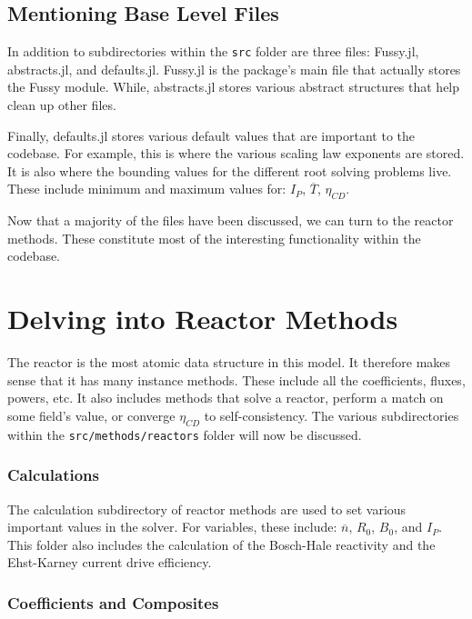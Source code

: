 \subsection{Mentioning Base Level Files}

In addition to subdirectories within the \texttt{src} folder are three files: Fussy.jl, abstracts.jl, and defaults.jl. Fussy.jl is the package's main file that actually stores the Fussy module. While, abstracts.jl stores various abstract structures that help clean up other files.

Finally, defaults.jl stores various default values that are important to the codebase. For example, this is where the various scaling law exponents are stored. It is also where the bounding values for the different root solving problems live. These include minimum and maximum values for: $I_P$, $\overline T$, $\eta_{CD}$.

Now that a majority of the files have been discussed, we can turn to the reactor methods. These constitute most of the interesting functionality within the codebase. 

\section{Delving into Reactor Methods}

The reactor is the most atomic data structure in this model. It therefore makes sense that it has many instance methods. These include all the coefficients, fluxes, powers, etc. It also includes methods that solve a reactor, perform a match on some field's value, or converge $\eta_{CD}$ to self-consistency. The various subdirectories within the \texttt{src/methods/reactors} folder will now be discussed.

\subsubsection{Calculations}

The calculation subdirectory of reactor methods are used to set various important values in the solver. For  variables, these include: $\overline n$, $R_0$, $B_0$, and $I_P$. This folder also includes the calculation of the Bosch-Hale reactivity and the Ehst-Karney current drive efficiency. 

\subsubsection{Coefficients and Composites}

